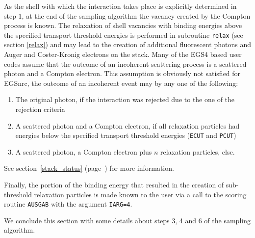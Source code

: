 As the shell with which the interaction takes place is explicitly determined 
in step 1, at the end of the sampling algorithm the vacancy created 
by the Compton process is known. The relaxation of shell vacancies 
with binding energies above the specified transport threshold 
energies is performed in subroutine {\tt relax} (see section \ref{relax}) and 
may lead to the creation of additional fluorescent photons and 
Auger and Coster-Kronig electrons on the stack. Many of the 
EGS4 based user codes assume that the outcome of an incoherent scattering 
process is a scattered photon and a Compton electron. This assumption 
is obviously not satisfied for EGSnrc, the outcome of an incoherent 
event may by any one of the following:
\begin{enumerate}
\item
The original photon, if the interaction was rejected due to the one 
of the rejection criteria
\item
A scattered photon and a Compton electron, if all relaxation particles 
had energies below the specified transport threshold energies 
({\tt ECUT} and {\tt PCUT})
\item
A scattered photon, a Compton electron plus $n$ relaxation particles, else.
\end{enumerate}
See section~\ref{stack_status} (page~\pageref{stack_status}) for more
information.

Finally, the portion of the binding energy that resulted in the creation 
of sub-threshold relaxation particles is made known to the user via 
a call to the scoring routine {\tt AUSGAB} with the argument {\tt IARG=4}. 

We conclude this section with some details about steps 3, 4 and 6 
of the sampling algorithm.

